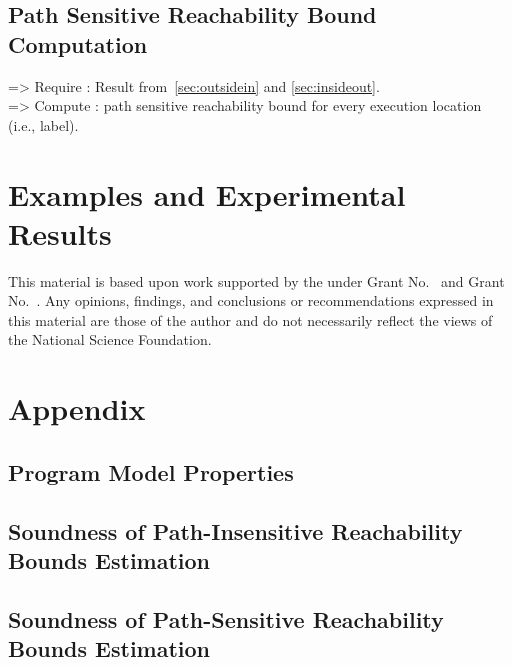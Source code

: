 \documentclass[sigplan,10pt,review,anonymous]{acmart}
\begin{document}
\subsection{Path Sensitive Reachability Bound Computation}
=> Require : Result from~\ref{sec:outsidein} and \ref{sec:insideout}.
\\
=> Compute : path sensitive reachability bound for every execution location (i.e., label).
\section{Examples and Experimental Results}
\label{sec:example}


\begin{acks}                            
This material is based upon work supported by the
 under Grant
No.~ and Grant
No.~.  Any opinions, findings, and
conclusions or recommendations expressed in this material are those
of the author and do not necessarily reflect the views of the
National Science Foundation.
\end{acks}

%


\appendix
\section{Appendix}
\subsection{Program Model Properties}
\label{apdx:lemma_sec123}
% 

\subsection{Soundness of Path-Insensitive Reachability Bounds Estimation}
\label{apdx:pathinsensitive_rb_soundness}
% 

\subsection{Soundness of Path-Sensitive Reachability Bounds Estimation}
\label{apdx:pathsensitive_rb_soundness}
\end{document}

